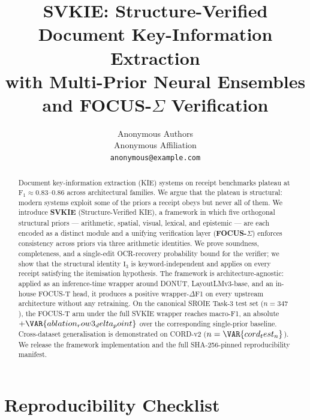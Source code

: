 \documentclass[conference]{IEEEtran}
\title{SVKIE: Structure-Verified Document Key-Information Extraction\\
       with Multi-Prior Neural Ensembles and FOCUS-$\Sigma$ Verification}
\author{Anonymous Authors\\Anonymous Affiliation\\
        \texttt{anonymous@example.com}}
\begin{document}
\maketitle

\begin{abstract}
Document key-information extraction (KIE) systems on receipt
benchmarks plateau at $\mathrm{F}_1 \approx 0.83$--$0.86$ across
architectural families.  We argue that the plateau is structural:
modern systems exploit some of the priors a receipt obeys but never
all of them.  We introduce \textbf{SVKIE} (Structure-Verified KIE), a
framework in which five orthogonal structural priors --- arithmetic,
spatial, visual, lexical, and epistemic --- are each encoded as a
distinct module and a unifying verification layer
(\textbf{FOCUS-$\Sigma$}) enforces consistency across priors via three
arithmetic identities.  We prove soundness, completeness, and a
single-edit OCR-recovery probability bound for the verifier; we show
that the structural identity $\mathrm{I}_3$ is keyword-independent and
applies on every receipt satisfying the itemisation hypothesis.  The
framework is architecture-agnostic: applied as an inference-time
wrapper around DONUT, LayoutLMv3-base, and an in-house FOCUS-T head,
it produces a positive wrapper-$\Delta$F1 on every upstream
architecture without any retraining.  On the canonical SROIE Task-3
test set ($n=347$), the FOCUS-T arm under the full SVKIE wrapper
reaches  macro-F1, an absolute
$+\VAR{ablation_row3_delta_point}$ over the corresponding
single-prior baseline.  Cross-dataset generalisation is demonstrated
on CORD-v2 ($n=\VAR{cord_test_n}$).  We release the framework
implementation and the full SHA-256-pinned reproducibility manifest.
\end{abstract}
































\section*{Reproducibility Checklist}
\label{sec:repro_checklist}

\end{document}
